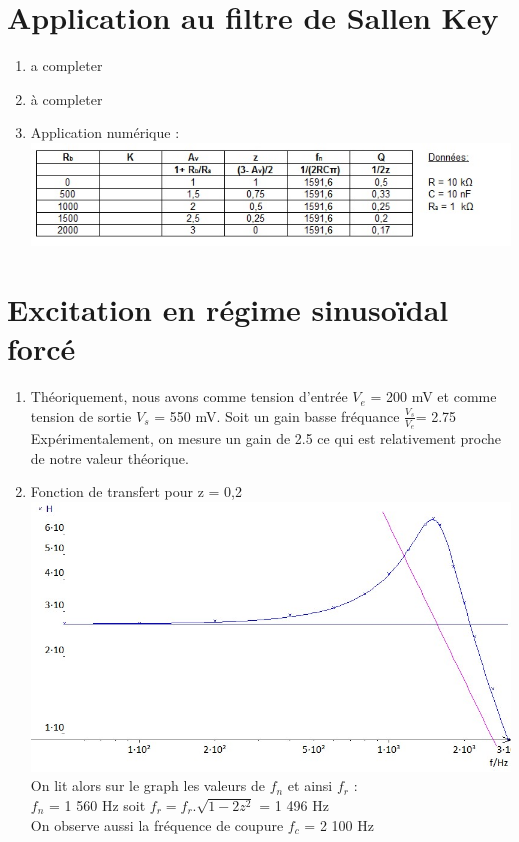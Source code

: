 \documentclass[12pt,a4paper]{article}
\begin{document}
\section{Application au filtre de Sallen Key}
\begin{enumerate}

\item a completer
\item à completer

\item Application numérique :\\
\includegraphics[scale=1]{tab1}
\end{enumerate}

\section{Excitation en régime sinusoïdal forcé}
\begin{enumerate}
\item Théoriquement, nous avons comme tension d'entrée $V_e$ = 200 mV et comme tension de sortie $V_s$ = 550 mV. Soit un gain basse fréquance $\frac{V_s}{V_e}$= 2.75\\
Expérimentalement, on mesure un gain de 2.5 ce qui est relativement proche de notre valeur théorique.

\item Fonction de transfert pour z = 0,2 \\
\includegraphics[scale=0.4]{graph1}
On lit alors sur le graph les valeurs de $f_n$ et ainsi $f_r$ :\\
$f_n$ = 1 560 Hz soit $f_r = f_r. \sqrt{1-2z^2}$ = 1 496 Hz \\
On observe aussi la fréquence de coupure  $f_c$ = 2 100 Hz
\end{enumerate}
\end{document}
